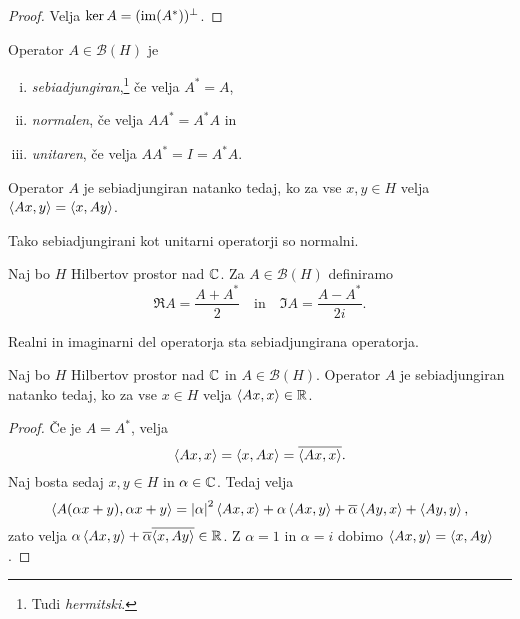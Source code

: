\begin{proof}
Velja $\ker A = (\operatorname{im}(A^*))^\bot$.
\end{proof}

\begin{definicija}
Operator $A \in \mathcal{B}(H)$ je

\begin{enumerate}[i)]
\item
\emph{sebiadjungiran},\footnote{Tudi
\emph{hermitski}.} če velja $A^* = A$,
\item \emph{normalen}, če velja
$AA^* = A^*A$ in
\item \emph{unitaren}, če velja
$AA^* = I = A^*A$.
\end{enumerate}
\end{definicija}

\begin{opomba}
Operator $A$ je sebiadjungiran natanko tedaj, ko za vse
$x, y \in H$ velja $\left\langle Ax,y\right\rangle = \left\langle x,Ay\right\rangle$.
\end{opomba}

\begin{opomba}
Tako sebiadjungirani kot unitarni operatorji so normalni.
\end{opomba}

\begin{definicija}
Naj bo $H$ Hilbertov prostor nad $\mathbb{C}$. Za $A \in \mathcal{B}(H)$
definiramo
\[
\Re A = \frac{A + A^*}{2}
\quad \text{in} \quad
\Im A = \frac{A-A^*}{2i}.
\]
\end{definicija}

\begin{opomba}
Realni in imaginarni del operatorja sta sebiadjungirana operatorja.
\end{opomba}

\begin{trditev}
Naj bo $H$ Hilbertov prostor nad $\mathbb{C}$ in $A \in \mathcal{B}(H)$.
Operator $A$ je sebiadjungiran natanko tedaj, ko za vse $x \in H$
velja $\left\langle Ax,x\right\rangle \in \mathbb{R}$.
\end{trditev}

\begin{proof}
Če je $A = A^*$, velja
\[
\left\langle Ax,x\right\rangle = \left\langle x,Ax\right\rangle = \overline{\left\langle Ax,x\right\rangle}.
\]
Naj bosta sedaj $x, y \in H$ in $\alpha \in \mathbb{C}$. Tedaj velja
\[
\left\langle A(\alpha x + y), \alpha x + y\right\rangle =
\left\lvert \alpha\right\rvert^2 \left\langle Ax,x\right\rangle + \alpha \left\langle Ax,y\right\rangle +
\overline{\alpha} \left\langle Ay, x\right\rangle + \left\langle Ay,y\right\rangle,
\]
zato velja
$\alpha \left\langle Ax,y\right\rangle + \overline{\alpha} \overline{\left\langle x,Ay\right\rangle} \in \mathbb{R}$. Z
$\alpha = 1$ in $\alpha = i$ dobimo $\left\langle Ax,y\right\rangle = \left\langle x,Ay\right\rangle$.
\end{proof}

